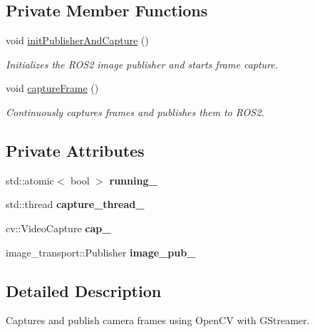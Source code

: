 \subsection*{Private Member Functions}
\begin{DoxyCompactItemize}
\item 
void \hyperlink{classCameraNode_ae82e95951417f976eed687ddf64c6d9f}{init\+Publisher\+And\+Capture} ()
\begin{DoxyCompactList}\small\item\em Initializes the R\+O\+S2 image publisher and starts frame capture. \end{DoxyCompactList}\item 
void \hyperlink{classCameraNode_a1a44c8d8757a75cf649cbcf49cfa1ca1}{capture\+Frame} ()
\begin{DoxyCompactList}\small\item\em Continuously captures frames and publishes them to R\+O\+S2. \end{DoxyCompactList}\end{DoxyCompactItemize}
\subsection*{Private Attributes}
\begin{DoxyCompactItemize}
\item 
\mbox{\label{classCameraNode_a589ef67a59d2205bb65beeaef950fb29}} 
std\+::atomic$<$ bool $>$ {\bfseries running\+\_\+}
\item 
\mbox{\label{classCameraNode_ad29d310c3d87b40124d35562c62af9ef}} 
std\+::thread {\bfseries capture\+\_\+thread\+\_\+}
\item 
\mbox{\label{classCameraNode_a4d4f490deef80022a254d3de565f2611}} 
cv\+::\+Video\+Capture {\bfseries cap\+\_\+}
\item 
\mbox{\label{classCameraNode_a59ce8fd47a93d1baecb2611ee5336d7b}} 
image\+\_\+transport\+::\+Publisher {\bfseries image\+\_\+pub\+\_\+}
\end{DoxyCompactItemize}


\subsection{Detailed Description}
Captures and publish camera frames using Open\+CV with G\+Streamer. 

